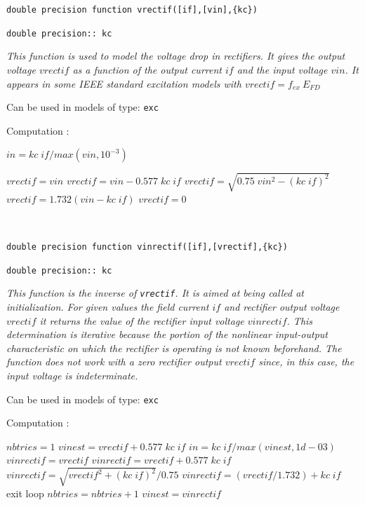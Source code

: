 {\large \tt double precision function vrectif([if],[vin],\{kc\})}

\hspace*{10ex} {\tt double precision:: kc}

{\it This function is used to model the voltage drop in rectifiers. It gives the output voltage $vrectif$ as a function of the output current $if$ and the input voltage $vin$. It appears in some IEEE standard excitation models with $vrectif= f_{ex} \: E_{FD}$}

Can be used in models of type: {\tt exc}

Computation : 

\hspace*{20ex}\begin{minipage}[t]{15cm}
\begin{algorithmic} 
\STATE $in=kc \; if / max(vin, 10^{-3})$

  \STATE $vrectif=vin$
  \STATE $vrectif=vin - 0.577 \; kc \;if$
  \STATE $vrectif= \sqrt{0.75 \; vin^2 - (kc \; if)^2}$
  \STATE $vrectif=1.732 (vin - kc \; if)$ 
\ELSE
  \STATE $vrectif=0$
\ENDIF
\end{algorithmic}
\end{minipage}

~ \hrulefill ~

{\large \tt double precision function vinrectif([if],[vrectif],\{kc\})}

\hspace*{10ex} {\tt double precision:: kc}

{\it This function is the inverse of {\tt vrectif}. It is aimed at being called at initialization. For given values the field current $if$ and rectifier output voltage $vrectif$ it returns the value of the rectifier input voltage $vinrectif$. This determination is iterative because the portion of the nonlinear input-output characteristic on which the rectifier is operating is not known beforehand. The function does not work with a zero rectifier output $vrectif$ since, in this case, the input voltage is indeterminate.}

Can be used in models of type: {\tt exc}

Computation : 

\hspace*{20ex}\begin{minipage}[t]{15cm}
\begin{algorithmic}
\STATE $nbtries=1$
\STATE $vinest=vrectif+0.577 \; kc \;if$
\LOOP
\STATE $in=kc \; if / max(vinest,1d-03)$
  \STATE $vinrectif=vrectif$
  \STATE $vinrectif=vrectif + 0.577 \; kc \;if$
  \STATE $vinrectif= \sqrt{vrectif^2 + (kc \; if)^2}/0.75$
\ELSE
  \STATE $vinrectif=(vrectif/1.732)+ kc \; if$
\ENDIF
{}
  \STATE exit loop
\ENDIF
\STATE $nbtries=nbtries+1$
\STATE $vinest=vinrectif$
\ENDLOOP
\end{algorithmic}
\end{minipage}

